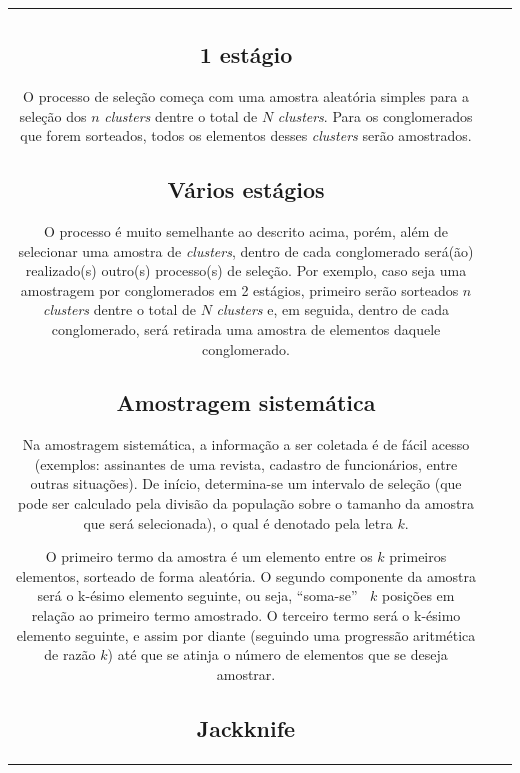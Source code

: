 \documentclass[
]{estat/estat}
\begin{document}
\begin{tabular}{c|cc}
\hypertarget{estuxe1gio}{%
\subsection{1 estágio}\label{estuxe1gio}}

O processo de seleção começa com uma amostra aleatória simples para a
seleção dos \(n\) \emph{clusters} dentre o total de \(N\)
\emph{clusters}. Para os conglomerados que forem sorteados, todos os
elementos desses \emph{clusters} serão amostrados.

\hypertarget{vuxe1rios-estuxe1gios}{%
\subsection{Vários estágios}\label{vuxe1rios-estuxe1gios}}

O processo é muito semelhante ao descrito acima, porém, além de
selecionar uma amostra de \emph{clusters}, dentro de cada conglomerado
será(ão) realizado(s) outro(s) processo(s) de seleção. Por exemplo, caso
seja uma amostragem por conglomerados em 2 estágios, primeiro serão
sorteados \(n\) \emph{clusters} dentre o total de \(N\) \emph{clusters}
e, em seguida, dentro de cada conglomerado, será retirada uma amostra de
elementos daquele conglomerado.

\hypertarget{amostragem-sistemuxe1tica}{%
\subsection{Amostragem sistemática}\label{amostragem-sistemuxe1tica}}

Na amostragem sistemática, a informação a ser coletada é de fácil acesso
(exemplos: assinantes de uma revista, cadastro de funcionários, entre
outras situações). De início, determina-se um intervalo de seleção (que
pode ser calculado pela divisão da população sobre o tamanho da amostra
que será selecionada), o qual é denotado pela letra \(k\).

O primeiro termo da amostra é um elemento entre os \(k\) primeiros
elementos, sorteado de forma aleatória. O segundo componente da amostra
será o k-ésimo elemento seguinte, ou seja, ``soma-se'' \(\:\) \(k\)
posições em relação ao primeiro termo amostrado. O terceiro termo será o
k-ésimo elemento seguinte, e assim por diante (seguindo uma progressão
aritmética de razão \(k\)) até que se atinja o número de elementos que
se deseja amostrar.

\hypertarget{jackknife}{%
\subsection{Jackknife}\label{jackknife}}


\end{tabular}
\end{document}
